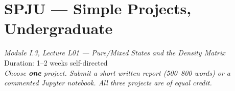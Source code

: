\documentclass[11pt,a4paper]{article}
\begin{document}
\section*{SPJU --- Simple Projects, Undergraduate}
\begin{center}
  \textit{Module I.3, Lecture L01 --- Pure/Mixed States and the Density Matrix}\\[4pt]
  \quad{}
  \qquad Duration: 1--2 weeks self-directed\\[6pt]
  \textit{Choose \textbf{one} project. Submit a short written report (500--800 words) or
  a commented Jupyter notebook. All three projects are of equal credit.}
\end{center}

\bigskip

\end{document}

